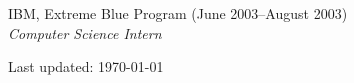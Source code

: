 \documentclass[10pt,letterpaper]{article}
\renewenvironment{itemize}{
  \begin{list}{}{
    \setlength{\leftmargin}{1.5em}
    \setlength{\itemsep}{0.25em}
    \setlength{\parskip}{0pt}
    \setlength{\parsep}{0.25em}
  }
}{
  \end{list}
}
\newenvironment{resexperience}[4]{
\item #1 (#3--#4) \\
\emph{#2}
}{
}
\begin{document}
\begin{itemize}
  \begin{resexperience}
    {IBM, Extreme Blue Program}
    {Computer Science Intern}
    {June 2003}
    {August 2003} 


  \end{resexperience}
  

\end{itemize}



\medskip

\begin{center}
  \begin{small}
    Last updated: \today
  \end{small}
\end{center}
\end{document}
